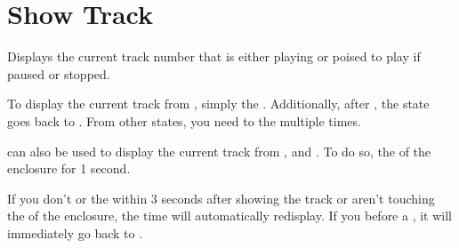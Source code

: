 \section{Show Track} \label{Show Track} 

Displays the current track number that is either playing or poised to play if
paused or stopped.


To display the current track from , simply  the .
Additionally, after , the state goes back to .
From other states, you need to  the  multiple times.


 can also be used to display the current track from , 
and .  To do so,  the  of the enclosure for
\num{1} second.



If you don't  or  the  within \num{3} seconds after
showing the track or aren't touching the  of the enclosure, the time
will automatically redisplay.  If you  before a , it will
immediately go back to .


